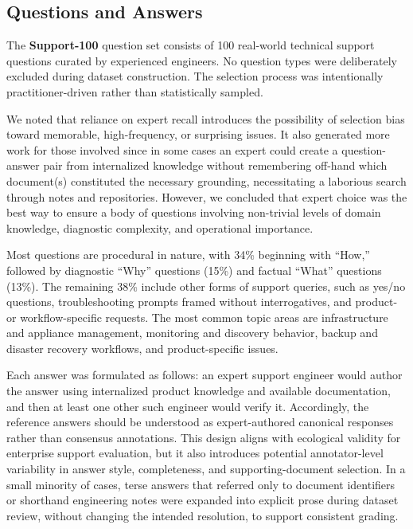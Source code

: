 \documentclass[11pt]{article}
\begin{document}
\subsection{Questions and Answers}

The \textbf{Support-100} question set consists of 100 real-world technical
support questions curated by experienced engineers. No question types were
deliberately excluded during dataset construction. The selection process
was intentionally practitioner-driven rather than statistically sampled.

We noted that reliance on expert recall introduces the possibility of
selection bias toward memorable, high-frequency, or surprising issues.
It also generated more work for those involved since in some cases an
expert could create a question-answer pair from internalized knowledge without
remembering off-hand which document(s) constituted the necessary grounding,
necessitating a laborious search through notes and repositories.
However, we concluded that expert choice was the best way to ensure a body
of questions involving non-trivial levels of domain knowledge, diagnostic
complexity, and operational importance.

Most questions are procedural in nature, with 34\% beginning with
``How,'' followed by diagnostic ``Why'' questions (15\%) and factual
``What'' questions (13\%). The remaining 38\% include other forms of
support queries, such as yes/no questions, troubleshooting prompts
framed without interrogatives, and product- or workflow-specific
requests. The most common topic areas are infrastructure and appliance
management, monitoring and discovery behavior, backup and disaster
recovery workflows, and product-specific issues.

Each answer was formulated as follows: an expert support engineer would author
the answer using internalized product knowledge and available documentation,
and then at least one other such engineer would verify it.
Accordingly, the reference answers should be understood as
expert-authored canonical responses rather than consensus annotations.
This design aligns with ecological validity for enterprise support evaluation,
but it also introduces potential annotator-level variability in answer style,
completeness, and supporting-document selection.
In a small minority of cases, terse answers that referred only to document
identifiers or shorthand engineering notes were expanded into explicit
prose during dataset review, without changing the intended resolution,
to support consistent grading.
\end{document}
